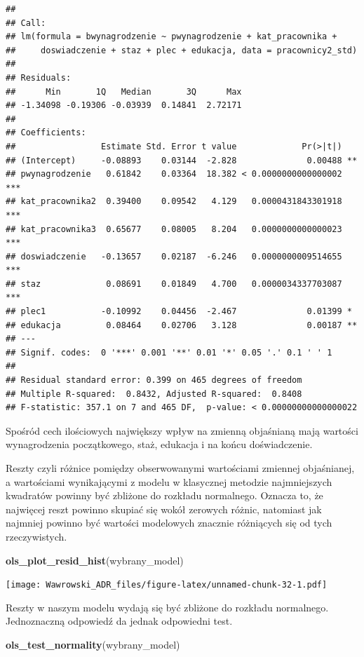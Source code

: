 \documentclass[]{book}
\newenvironment{Shaded}{\begin{snugshade}}{\end{snugshade}}
\newcommand{\KeywordTok}[1]{\textcolor[rgb]{0.13,0.29,0.53}{\textbf{#1}}}
\newcommand{\NormalTok}[1]{#1}
\begin{document}
\begin{verbatim}
## 
## Call:
## lm(formula = bwynagrodzenie ~ pwynagrodzenie + kat_pracownika + 
##     doswiadczenie + staz + plec + edukacja, data = pracownicy2_std)
## 
## Residuals:
##      Min       1Q   Median       3Q      Max 
## -1.34098 -0.19306 -0.03939  0.14841  2.72171 
## 
## Coefficients:
##                 Estimate Std. Error t value             Pr(>|t|)    
## (Intercept)     -0.08893    0.03144  -2.828              0.00488 ** 
## pwynagrodzenie   0.61842    0.03364  18.382 < 0.0000000000000002 ***
## kat_pracownika2  0.39400    0.09542   4.129   0.0000431843301918 ***
## kat_pracownika3  0.65677    0.08005   8.204   0.0000000000000023 ***
## doswiadczenie   -0.13657    0.02187  -6.246   0.0000000009514655 ***
## staz             0.08691    0.01849   4.700   0.0000034337703087 ***
## plec1           -0.10992    0.04456  -2.467              0.01399 *  
## edukacja         0.08464    0.02706   3.128              0.00187 ** 
## ---
## Signif. codes:  0 '***' 0.001 '**' 0.01 '*' 0.05 '.' 0.1 ' ' 1
## 
## Residual standard error: 0.399 on 465 degrees of freedom
## Multiple R-squared:  0.8432, Adjusted R-squared:  0.8408 
## F-statistic: 357.1 on 7 and 465 DF,  p-value: < 0.00000000000000022
\end{verbatim}

Spośród cech ilościowych największy wpływ na zmienną objaśnianą mają wartości wynagrodzenia początkowego, staż, edukacja i na końcu doświadczenie.

Reszty czyli różnice pomiędzy obserwowanymi wartościami zmiennej objaśnianej, a wartościami wynikającymi z modelu w klasycznej metodzie najmniejszych kwadratów powinny być zbliżone do rozkładu normalnego. Oznacza to, że najwięcej reszt powinno skupiać się wokół zerowych różnic, natomiast jak najmniej powinno być wartości modelowych znacznie różniących się od tych rzeczywistych.

\begin{Shaded}
\begin{Highlighting}[]
\KeywordTok{ols_plot_resid_hist}\NormalTok{(wybrany_model)}
\end{Highlighting}
\end{Shaded}

\texttt{[image: Wawrowski\_ADR\_files/figure-latex/unnamed-chunk-32-1.pdf]}

Reszty w naszym modelu wydają się być zbliżone do rozkładu normalnego. Jednoznaczną odpowiedź da jednak odpowiedni test.

\begin{Shaded}
\begin{Highlighting}[]
\KeywordTok{ols_test_normality}\NormalTok{(wybrany_model)}
\end{Highlighting}
\end{Shaded}
\end{document}
